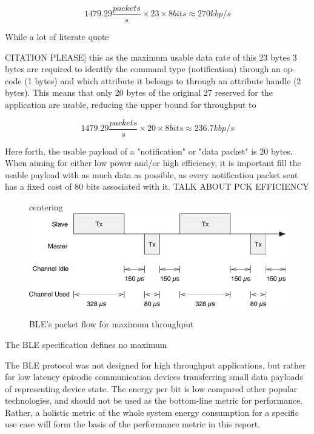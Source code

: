 \documentclass[]{article}
\begin{document}
\begin{displaymath}
1479.29 \frac{packets}{s} \times 23 \times 8 bits \approx 270 kbp/s
\end{displaymath}

While a lot of literate quote{CITATION PLEASE] this as the maximum usable data rate of this 23 bytes 3 bytes are required to identify the command type (notification) through an op-code (1 bytes) and which attribute it belongs to through an attribute handle (2 bytes). This means that only 20 bytes of the original 27 reserved for the application are usable, reducing the upper bound for throughput to 

\begin{displaymath}
1479.29 \frac{packets}{s} \times 20 \times 8 bits \approx 236.7 kbp/s
\end{displaymath}

Here forth, the usable payload of a "notification" or "data packet" is 20 bytes. When aiming for either low power and/or high efficiency, it is important fill the usable payload with as much data as possible, as every notification packet sent has a fixed cost of 80 bits associated with it. TALK ABOUT PCK EFFICIENCY 

\begin{figure}[h]
	centering
		\includegraphics[width = 1\textwidth]{turnaround}
	\caption{\ac{BLE}'s packet flow for maximum throughput}
	\label{fig:turnaround}
\end{figure}

The \ac{BLE} specification defines no maximum 

The \ac{BLE} protocol was not designed for high throughput applications, but rather for low latency episodic communication devices transferring small data payloads of representing device state. The energy per bit is low compared other popular technologies, and should not be used as the bottom-line metric for performance. Rather, a holistic metric of the whole system energy consumption for a specific use case will form the basis of the performance metric in this report.








}
\end{document}
